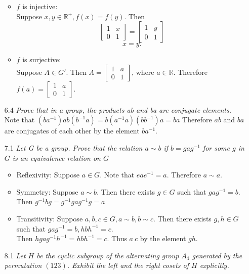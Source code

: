 \documentclass[12pt, letterpaper]{article}
\newcommand{\R}{\mathbb{R}}
\begin{document}
\begin{enumerate}
\begin{itemize}
		\item $f$ is injective:\\
		Suppose $x,y \in \R^+, f(x) = f(y)$. Then
		$$
		 \begin{bmatrix}1 & x\\ 0 & 1\end{bmatrix} =  \begin{bmatrix}1 & y\\ 0 & 1\end{bmatrix}
		$$
		$$
			x = y.		
		$$
		\item $f$ is surjective:\\
		Suppose $A \in G'$.  Then $A =  \begin{bmatrix}1 & a\\ 0 & 1\end{bmatrix}$, where $a \in \R$.  Therefore $f(a) =  \begin{bmatrix}1 & a\\ 0 & 1\end{bmatrix}$.  
\end{itemize}	 
	\item[6.4] \textit{Prove that in a group, the products ab and ba are conjugate elements.}\\
	Note that $(ba^{-1})ab(b^{-1}a) = b(a^{-1}a)(b b^{-1})a = ba$	
	Therefore $ab$ and $ba$ are conjugates of each other by the element 
	$ba^{-1}$.  
	\item[7.1] \textit{Let G be a group. Prove that the relation $a \sim b$ if $b = gag^{-1}$ for some $g$ in $G$ is an
equivalence relation on $G$}
	\begin{itemize}
		\item Reflexivity:   Suppose $a \in G$. Note that $e a e^{-1} = a$.
		Therefore $a \sim a$.
		\item Symmetry: Suppose $a \sim b$.  Then there exists $g \in G$ such that $g a g^{-1} = b$.  Then $g^{-1} b g = g^{-1} g a g^{-1} g = a$
		\item Transitivity:  Suppose $a,b,c \in G,a \sim b, b \sim c$.  
		Then there exists $g,h \in G$ such that $g a g^{-1} = b, h b h^{-1} = c$.  \\
		Then $hgag^{-1}h^{-1} = hbh^{-1} = c$.  Thus $a~c$ by the element $gh$.   
	\end{itemize}
	\item[8.1]\textit{Let $H$ be the cyclic subgroup of the alternating group $A_4$ generated by the permutation
$(123)$. Exhibit the left and the right cosets of $H$ explicitly.}\\
		\begin{itemize}

\end{itemize}
\end{enumerate}
\end{document}

